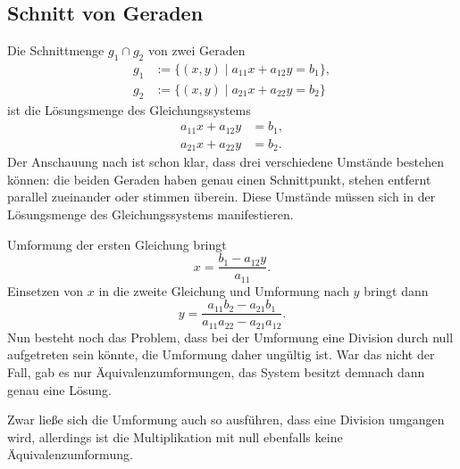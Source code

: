 \subsection{Schnitt von Geraden}

Die Schnittmenge $g_1\cap g_2$ von zwei Geraden
\[\begin{split}
g_1 &:= \{(x,y)\mid a_{11}x+a_{12}y = b_1\},\\
g_2 &:= \{(x,y)\mid a_{21}x+a_{22}y = b_2\}
\end{split}\]
ist die Lösungsmenge des Gleichungssystems
\begin{equation}
\begin{split}\label{eq:LGS}
a_{11}x+a_{12}y &= b_1,\\
a_{21}x+a_{22}y &= b_2.
\end{split}
\end{equation}
Der Anschauung nach ist schon klar, dass drei verschiedene
Umstände bestehen können: die beiden Geraden haben genau
einen Schnittpunkt, stehen entfernt parallel zueinander
oder stimmen überein. Diese Umstände müssen sich in der Lösungsmenge
des Gleichungssystems manifestieren.

Umformung der ersten Gleichung bringt
\[x = \frac{b_1-a_{12}y}{a_{11}}.\]
Einsetzen von $x$ in die zweite Gleichung
und Umformung nach $y$ bringt dann%
\[y = \frac{a_{11}b_2-a_{21}b_1}{a_{11}a_{22}-a_{21}a_{12}}.\]
Nun besteht noch das Problem, dass bei der Umformung eine Division
durch null aufgetreten sein könnte, die Umformung daher ungültig ist.
War das nicht der Fall, gab es nur Äquivalenzumformungen, das
System besitzt demnach dann genau eine Lösung.

Zwar ließe sich die Umformung auch so ausführen, dass eine Division
umgangen wird, allerdings ist die Multiplikation mit null ebenfalls
keine Äquivalenzumformung.

